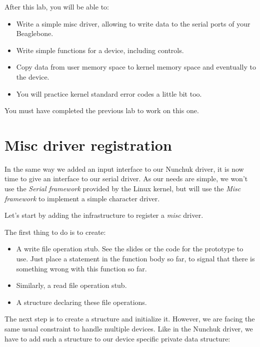 
After this lab, you will be able to:

\begin{itemize}
\item Write a simple misc driver, allowing to write data to the
  serial ports of your Beaglebone.
\item Write simple  functions for a device,
  including  controls.
\item Copy data from user memory space to kernel memory space and
  eventually to the device.
\item You will practice kernel standard error codes a little bit too.
\end{itemize}

You must have completed the previous lab to work on this one.

\section{Misc driver registration}

In the same way we added an input interface to our Nunchuk driver, it is
now time to give an interface to our serial driver. As our needs are
simple, we won't use the {\em Serial framework} provided by the Linux
kernel, but will use the {\em Misc framework} to implement a simple
character driver.

Let's start by adding the infrastructure to register a {\em misc}
driver.

The first thing to do is to create:

\begin{itemize}
\item A  write file operation stub.
      See the slides or the code for the prototype to use.
      Just place a  statement in the function
      body so far, to signal that there is something wrong with this
      function so far.
\item Similarly, a  read file operation stub.
\item A  structure declaring these file
      operations.
\end{itemize}

The next step is to create a  structure and initialize
it. However, we are facing the same usual constraint to handle multiple
devices. Like in the Nunchuk driver, we have to add such a structure
to our device specific private data structure:

